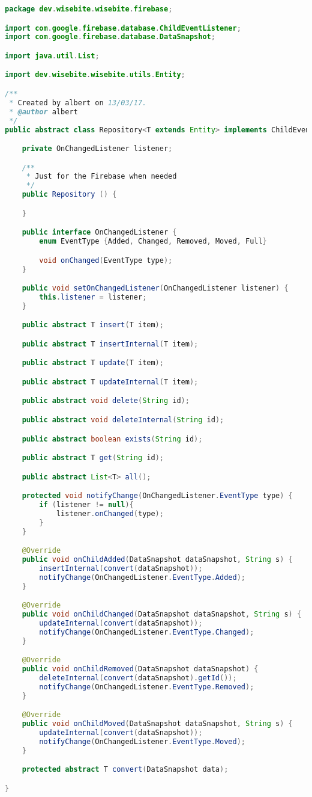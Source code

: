 \begin{lstlisting}[language=java,firstnumber=1]
package dev.wisebite.wisebite.firebase;

import com.google.firebase.database.ChildEventListener;
import com.google.firebase.database.DataSnapshot;

import java.util.List;

import dev.wisebite.wisebite.utils.Entity;

/**
 * Created by albert on 13/03/17.
 * @author albert
 */
public abstract class Repository<T extends Entity> implements ChildEventListener {

    private OnChangedListener listener;

    /**
     * Just for the Firebase when needed
     */
    public Repository () {

    }

    public interface OnChangedListener {
        enum EventType {Added, Changed, Removed, Moved, Full}

        void onChanged(EventType type);
    }

    public void setOnChangedListener(OnChangedListener listener) {
        this.listener = listener;
    }

    public abstract T insert(T item);

    public abstract T insertInternal(T item);

    public abstract T update(T item);

    public abstract T updateInternal(T item);

    public abstract void delete(String id);

    public abstract void deleteInternal(String id);

    public abstract boolean exists(String id);

    public abstract T get(String id);

    public abstract List<T> all();

    protected void notifyChange(OnChangedListener.EventType type) {
        if (listener != null){
            listener.onChanged(type);
        }
    }

    @Override
    public void onChildAdded(DataSnapshot dataSnapshot, String s) {
        insertInternal(convert(dataSnapshot));
        notifyChange(OnChangedListener.EventType.Added);
    }

    @Override
    public void onChildChanged(DataSnapshot dataSnapshot, String s) {
        updateInternal(convert(dataSnapshot));
        notifyChange(OnChangedListener.EventType.Changed);
    }

    @Override
    public void onChildRemoved(DataSnapshot dataSnapshot) {
        deleteInternal(convert(dataSnapshot).getId());
        notifyChange(OnChangedListener.EventType.Removed);
    }

    @Override
    public void onChildMoved(DataSnapshot dataSnapshot, String s) {
        updateInternal(convert(dataSnapshot));
        notifyChange(OnChangedListener.EventType.Moved);
    }

    protected abstract T convert(DataSnapshot data);

}
\end{lstlisting}

